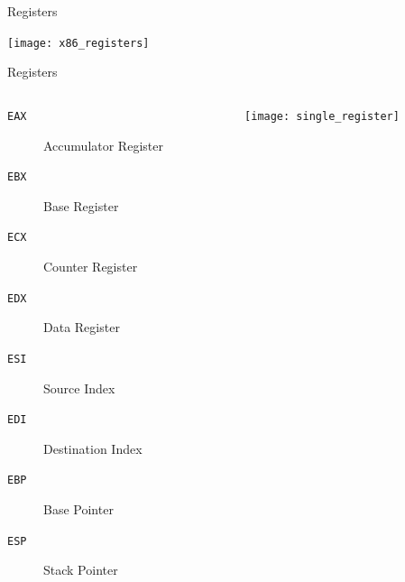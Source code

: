 \documentclass[beamer]{uibk}
\begin{document}
\begin{frame}{Registers}
    \begin{center}
        \texttt{[image: x86\_registers]}
    \end{center}
\end{frame}

\begin{frame}{Registers}
    \begin{columns}
        \begin{column}{0.45\textwidth}
            \begin{description}
                \item[\texttt{EAX}] Accumulator Register
                \item[\texttt{EBX}] Base Register
                \item[\texttt{ECX}] Counter Register
                \item[\texttt{EDX}] Data Register
                \item[\texttt{ESI}] Source Index
                \item[\texttt{EDI}] Destination Index
                \item[\texttt{EBP}] Base Pointer
                \item[\texttt{ESP}] Stack Pointer
            \end{description}
        \end{column}
        \begin{column}{0.55\textwidth}
                \texttt{[image: single\_register]}
        \end{column}
    \end{columns}
\end{frame}
\end{document}
